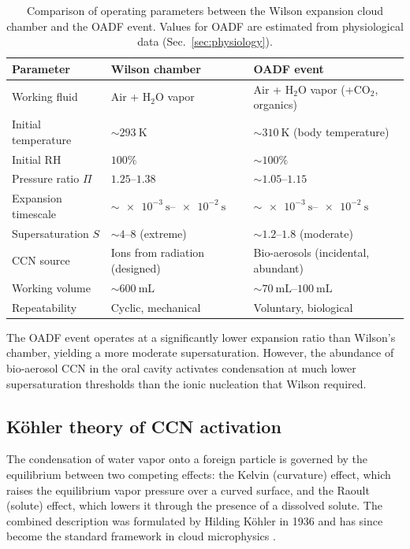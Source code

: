 \documentclass[11pt,a4paper]{article}
\theoremstyle{definition}
\theoremstyle{plain}
\begin{document}
\begin{table}[h]
\centering
\small
\caption{\label{tab:comparison}Comparison of operating parameters between the Wilson expansion cloud chamber and the OADF event. Values for OADF are estimated from physiological data (Sec.~\ref{sec:physiology}).}
\begin{tabular}{@{}lll@{}}
\toprule
\textbf{Parameter} & \textbf{Wilson chamber} & \textbf{OADF event} \\
\midrule
Working fluid          & Air + H$_2$O vapor              & Air + H$_2$O vapor (+CO$_2$, organics) \\
Initial temperature    & $\sim\SI{293}{\kelvin}$         & $\sim\SI{310}{\kelvin}$ (body temperature) \\
Initial RH             & $100\%$                          & $\sim 100\%$ \\
Pressure ratio $\Pi$   & $1.25\text{--}1.38$              & $\sim 1.05\text{--}1.15$ \\
Expansion timescale    & $\sim\SIrange{e-3}{e-2}{\second}$ & $\sim\SIrange{e-3}{e-2}{\second}$ \\
Supersaturation $S$    & $\sim 4\text{--}8$ (extreme)    & $\sim 1.2\text{--}1.8$ (moderate) \\
CCN source             & Ions from radiation (designed)  & Bio-aerosols (incidental, abundant) \\
Working volume         & $\sim\SI{600}{\milli\liter}$    & $\sim\SIrange{70}{100}{\milli\liter}$ \\
Repeatability          & Cyclic, mechanical              & Voluntary, biological \\
\bottomrule
\end{tabular}
\end{table}

The OADF event operates at a significantly lower expansion ratio than Wilson's chamber, yielding a more moderate supersaturation. However, the abundance of bio-aerosol CCN in the oral cavity activates condensation at much lower supersaturation thresholds than the ionic nucleation that Wilson required.

\subsection{Köhler theory of CCN activation}
\label{sec:kohler}

The condensation of water vapor onto a foreign particle is governed by the equilibrium between two competing effects: the Kelvin (curvature) effect, which raises the equilibrium vapor pressure over a curved surface, and the Raoult (solute) effect, which lowers it through the presence of a dissolved solute. The combined description was formulated by Hilding Köhler in 1936 \citep{Koehler1936} and has since become the standard framework in cloud microphysics \citep{PruppacherKlett2010,SeinfeldPandis2016}.
\end{document}
